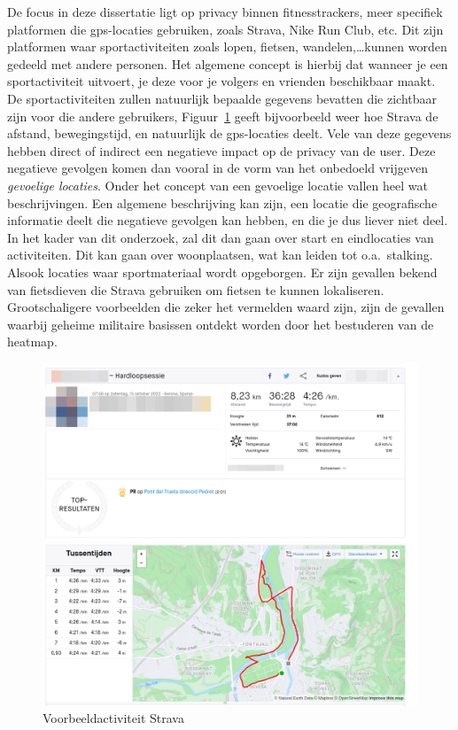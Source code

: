 De focus in deze dissertatie ligt op privacy binnen fitnesstrackers, meer
specifiek platformen die gps-locaties gebruiken, zoals Strava, Nike Run Club,
etc. Dit zijn platformen waar sportactiviteiten zoals lopen, fietsen,
wandelen,\ldots kunnen worden gedeeld met andere personen. Het algemene concept
is hierbij dat wanneer je een sportactiviteit uitvoert, je deze voor je volgers
en vrienden beschikbaar maakt. De sportactiviteiten zullen natuurlijk bepaalde
gegevens bevatten die zichtbaar zijn voor die andere gebruikers,
Figuur~\ref{fig:activityExample} geeft bijvoorbeeld weer hoe Strava de afstand,
bewegingstijd, en natuurlijk de gps-locaties deelt. Vele van deze gegevens
hebben direct of indirect een negatieve impact op de privacy van de user. Deze
negatieve gevolgen komen dan vooral in de vorm van het onbedoeld vrijgeven
\textit{gevoelige locaties}. Onder het concept van een gevoelige locatie vallen
heel wat beschrijvingen. Een algemene beschrijving kan zijn, een locatie die
geografische informatie deelt die negatieve gevolgen kan hebben, en die je dus
liever niet deel. In het kader van dit onderzoek, zal dit dan gaan over start
en eindlocaties van activiteiten. Dit kan gaan over woonplaatsen, wat kan
leiden tot o.a.\ stalking. Alsook locaties waar sportmateriaal wordt
opgeborgen. Er zijn gevallen bekend van fietsdieven die Strava gebruiken om
fietsen te kunnen lokaliseren\cite{Sportapp72:online}\cite{Cyclistw89:online}.
Grootschaligere voorbeelden die zeker het vermelden waard zijn, zijn de
gevallen waarbij geheime militaire basissen ontdekt worden door het bestuderen
van de heatmap\cite{Fitnesst33:online}.
\begin{figure}
    \centering
    \includegraphics[width=0.5\linewidth]{fig/VoorbeeldActiviteiten/VoorbeeldActiviteit_Cropped.png}
    \caption{Voorbeeldactiviteit Strava}\label{fig:activityExample}
\end{figure}

